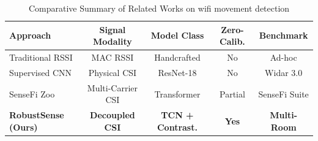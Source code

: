 \begin{table}[t]
\caption{Comparative Summary of Related Works on wifi movement detection}
\label{tab:related_summary}
\centering
\begin{tabular}{lcccc}
\hline
\textbf{Approach} & \textbf{Signal Modality} & \textbf{Model Class} & \textbf{Zero-Calib.} & \textbf{Benchmark} \\
\hline
Traditional RSSI & MAC RSSI & Handcrafted & No & Ad-hoc \\
Supervised CNN & Physical CSI & ResNet-18 & No & Widar 3.0 \\
SenseFi Zoo \cite{yang2022sensefi} & Multi-Carrier CSI & Transformer & Partial & SenseFi Suite \\
\textbf{RobustSense (Ours)} & \textbf{Decoupled CSI} & \textbf{TCN + Contrast.} & \textbf{Yes} & \textbf{Multi-Room} \\
\hline
\end{tabular}
\end{table}
